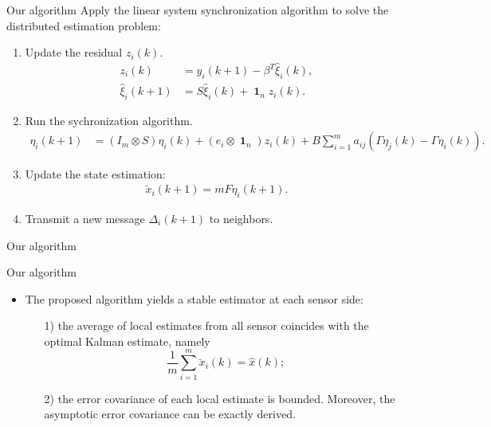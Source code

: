 \documentclass[10pt]{beamer}
\DeclareMathOperator{\1}{\textbf{1}}
\begin{document}
\begin{frame}{Our algorithm}
Apply the linear system synchronization algorithm to solve the distributed estimation problem:
	\begin{enumerate}
		\item \textcolor{thupurple}{Update the residual} $z_i(k)$.
		\begin{align*}
		z_i(k)&=y_i(k+1)-\beta^T\hat\xi_i(k),\\
		\hat\xi_i(k+1)&=S\hat\xi_i(k)+\1_nz_i(k).
		\end{align*}
		\item Run the \textcolor{thupurple}{sychronization} algorithm.
		\begin{align*}
		\eta_i(k+1)&=(I_m\otimes S)\eta_i(k) +(e_i\otimes\1_n)z_i(k)+
 B\sum_{i=1}^m a_{ij}(\Gamma \eta_j(k)-\Gamma \eta_i(k)).
		\end{align*}
		\item Update the state estimation:
		\begin{align*}
		\breve x_i(k+1)=mF\eta_i(k+1).
		\end{align*}
		\item Transmit a new message $\Delta_i(k+1)$ to neighbors.
	\end{enumerate}
\end{frame}

\begin{frame}{Our algorithm}
\begin{figure}
	\centering
	\resizebox{0.63\textwidth}{!}{}
\end{figure}
\end{frame}

\begin{frame}{Our algorithm}
	\begin{itemize}
		\item The proposed algorithm yields a \textcolor{thupurple}{stable estimator} at each sensor side:
		\begin{enumerate}
			\item[1)] the average of local estimates from all sensor coincides with the optimal Kalman estimate, namely
			\begin{equation}
			\frac{1}{m}\sum_{i=1}^m \breve{x}_i(k)=\hat{x}(k);
			\end{equation}
			\item[2)] the error covariance of each local estimate is bounded. Moreover, the asymptotic error covariance can be exactly derived.
		\end{enumerate} 
	\end{itemize}
\end{frame}
\end{document}
